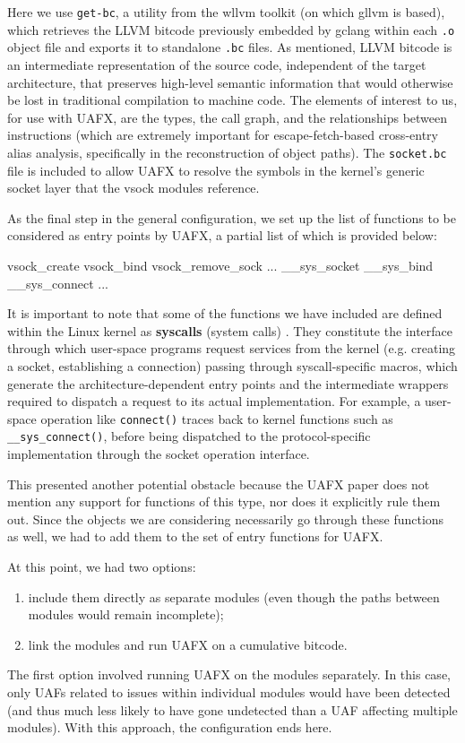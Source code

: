 \noindent Here we use \texttt{get-bc}, a utility from the wllvm toolkit (on which gllvm is based), which retrieves the LLVM bitcode previously embedded by gclang within each \texttt{.o} object file and exports it to standalone \texttt{.bc} files. As mentioned, LLVM bitcode is an intermediate representation of the source code, independent of the target architecture, that preserves high-level semantic information that would otherwise be lost in traditional compilation to machine code. The elements of interest to us, for use with UAFX, are the types, the call graph, and the relationships between instructions (which are extremely important for escape-fetch-based cross-entry alias analysis, specifically in the reconstruction of object paths). The \texttt{socket.bc} file is included to allow UAFX to resolve the symbols in the kernel's generic socket layer that the vsock modules reference.

As the final step in the general configuration, we set up the list of functions to be considered as entry points by UAFX, a partial list of which is provided below:
\begin{bashlncode}
vsock_create
vsock_bind
vsock_remove_sock
...
__sys_socket
__sys_bind
__sys_connect
...
\end{bashlncode}
It is important to note that some of the functions we have included are defined within the Linux kernel as \textbf{syscalls} (system calls) \cite{bib:syscalls}. They constitute the interface through which user-space programs request services from the kernel (e.g. creating a socket, establishing a connection) passing through syscall-specific macros, which generate the architecture-dependent entry points and the intermediate wrappers required to dispatch a request to its actual implementation. For example, a user-space operation like \texttt{connect()} traces back to kernel functions such as \texttt{\_\_sys\_connect()}, before being dispatched to the protocol-specific implementation through the socket operation interface.

This presented another potential obstacle because the UAFX paper does not mention any support for functions of this type, nor does it explicitly rule them out. Since the objects we are considering necessarily go through these functions as well, we had to add them to the set of entry functions for UAFX.

\noindent At this point, we had two options:
\begin{enumerate}
    \item include them directly as separate modules (even though the paths between modules would remain incomplete);
    
    \item link the modules and run UAFX on a cumulative bitcode.
\end{enumerate}
The first option involved running UAFX on the modules separately. In this case, only UAFs related to issues within individual modules would have been detected (and thus much less likely to have gone undetected than a UAF affecting multiple modules). With this approach, the configuration ends here.

